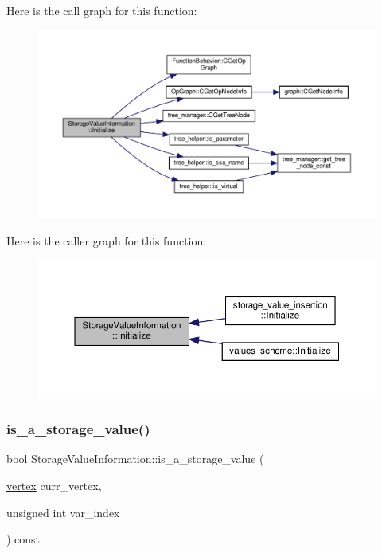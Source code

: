 Here is the call graph for this function\+:
\nopagebreak
\begin{figure}[H]
\begin{center}
\leavevmode
\includegraphics[width=350pt]{d8/dbe/classStorageValueInformation_af5c2b65a807420f83b1cf8d7a8516f5b_cgraph}
\end{center}
\end{figure}
Here is the caller graph for this function\+:
\nopagebreak
\begin{figure}[H]
\begin{center}
\leavevmode
\includegraphics[width=350pt]{d8/dbe/classStorageValueInformation_af5c2b65a807420f83b1cf8d7a8516f5b_icgraph}
\end{center}
\end{figure}
\mbox{\label{classStorageValueInformation_ad1eb25efaf228bcf4d2b3d62b7b6d102}} 
\subsubsection{\texorpdfstring{is\+\_\+a\+\_\+storage\+\_\+value()}{is\_a\_storage\_value()}}
{\footnotesize\ttfamily bool Storage\+Value\+Information\+::is\+\_\+a\+\_\+storage\+\_\+value (\begin{DoxyParamCaption}\item[{\hyperlink{graph_8hpp_abefdcf0544e601805af44eca032cca14}{vertex}}]{curr\+\_\+vertex,  }\item[{unsigned int}]{var\+\_\+index }\end{DoxyParamCaption}) const}



